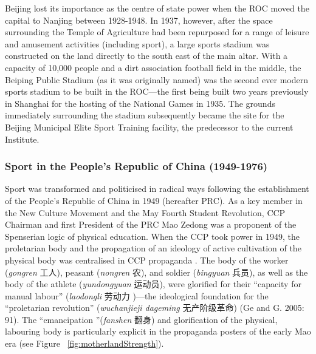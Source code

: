 \begin{CJK}{UTF8}{gbsn}
Beijing lost its importance as the centre of state power when the ROC moved the capital to Nanjing between 1928-1948.  In 1937, however, after the space surrounding the Temple of Agriculture had been repurposed for a range of leisure and amusement activities (including sport), a large sports stadium was constructed on the land directly to the south east of the main altar.  With a capacity of 10,000 people and a dirt association football field in the middle, the Beiping Public Stadium (as it was originally named) was the second ever modern sports stadium to be built in the ROC---the first being built two years previously in Shanghai for the hosting of the National Games in 1935.  The grounds immediately surrounding the stadium subsequently became the site for the Beijing Municipal Elite Sport Training facility, the predecessor to the current Institute.


\subsubsection{Sport in the People's Republic of China (1949-1976)}
Sport was transformed and politicised in radical ways following the establishment of the People’s Republic of China in 1949 (hereafter PRC).  As a key member in the New Culture Movement and the May Fourth Student Revolution, CCP Chairman and first President of the PRC Mao Zedong was a proponent of the Spenserian logic of physical education.  When the CCP took power in 1949, the proletarian body and the propagation of an ideology of active cultivation of the physical body was centralised in CCP propaganda \citep[58]{Brownell1995}.  The body of the worker (\textit{gongren} 工人), peasant (\textit{nongren} 农), and soldier (\textit{bingyuan} 兵员), as well as the body of the athlete (\textit{yundongyuan} 运动员), were glorified for their ``capacity for manual labour'' (\textit{laodongli} 劳动力 )---the ideological foundation for the ``proletarian revolution'' (\textit{wuchanjieji dageming} 无产阶级革命) (Ge and G. 2005: 91).  The ``emancipation ''(\textit{fanshen} 翻身) and glorification of the physical, labouring body is particularly explicit in the propaganda posters of the early Mao era \citep[87]{Ge2005} (see Figure ~\ref{fig:motherlandStrength}).


\end{CJK}

